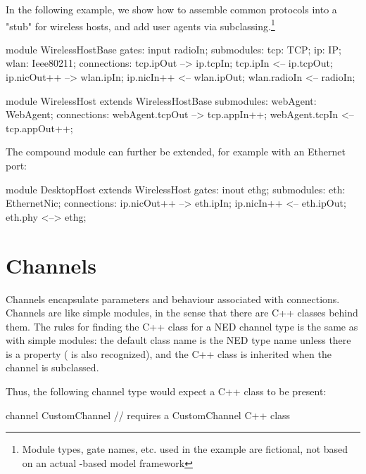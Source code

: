 In the following example, we show how to assemble common protocols
into a "stub" for wireless hosts, and add user agents via
subclassing.\footnote{Module types, gate names, etc. used in the example
are fictional, not based on an actual {\opp}-based model framework}

\begin{ned}
module WirelessHostBase
{
   gates:
       input radioIn;
   submodules:
       tcp: TCP;
       ip: IP;
       wlan: Ieee80211;
   connections:
       tcp.ipOut --> ip.tcpIn;
       tcp.ipIn <-- ip.tcpOut;
       ip.nicOut++ --> wlan.ipIn;
       ip.nicIn++ <-- wlan.ipOut;
       wlan.radioIn <-- radioIn;
}

module WirelessHost extends WirelessHostBase
{
   submodules:
       webAgent: WebAgent;
   connections:
       webAgent.tcpOut --> tcp.appIn++;
       webAgent.tcpIn <-- tcp.appOut++;
}
\end{ned}

The  compound module can further be extended,
for example with an Ethernet port:

\begin{ned}
module DesktopHost extends WirelessHost
{
   gates:
       inout ethg;
   submodules:
       eth: EthernetNic;
   connections:
       ip.nicOut++ --> eth.ipIn;
       ip.nicIn++ <-- eth.ipOut;
       eth.phy <--> ethg;
}
\end{ned}



\section{Channels}
\label{sec:ch-ned-lang:channels}

Channels encapsulate parameters and behaviour associated with connections.
Channels are like simple modules, in the sense that there are C++ classes
behind them. The rules for finding the C++ class for a NED channel type is
the same as with simple modules: the default class name is the NED type
name unless there is a  property ( is also
recognized), and the C++ class is inherited when the channel is subclassed.

Thus, the following channel type would expect a  C++ class
to be present:

\begin{ned}
channel CustomChannel  // requires a CustomChannel C++ class
{
}
\end{ned}

